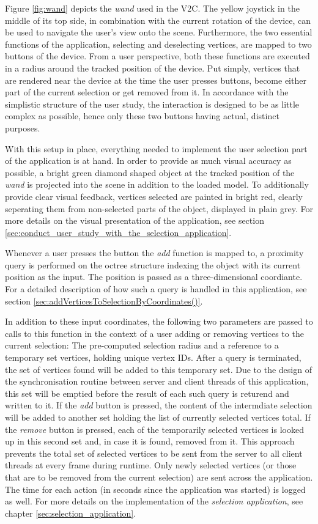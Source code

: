 Figure \ref{fig:wand} depicts the \textit{wand} used in the V2C. The yellow joystick in the middle of its top side, in combination with the current rotation of the device, can be used to navigate the user's view onto the scene. Furthermore, the two essential functions of the application, selecting and deselecting vertices, are mapped to two buttons of the device. From a user perspective, both these functions are executed in a radius around the tracked position of the device. Put simply, vertices that are rendered near the device at the time the user presses buttons, become either part of the current selection or get removed from it. In accordance with the simplistic structure of the user study, the interaction is designed to be as little complex as possible, hence only these two buttons having actual, distinct purposes. 

With this setup in place, everything needed to implement the user selection part of the application is at hand. In order to provide as much visual accuracy as possible, a bright green diamond shaped object at the tracked position of the \textit{wand} is projected into the scene in addition to the loaded model. To additionally provide clear visual feedback, vertices selected are painted in bright red, clearly seperating them from non-selected parts of the object, displayed in plain grey. For more details on the visual presentation of the application, see section \ref{sec:conduct_user_study_with_the_selection_application}.

Whenever a user presses the button the \textit{add} function is mapped to, a proximity query is performed on the octree structure indexing the object with its current position as the input. The position is passed as a three-dimensional coordiante. For a detailed description of how such a query is handled in this application, see section \ref{sec:addVerticesToSelectionByCoordinates()}.

In addition to these input coordinates, the following two parameters are passed to calls to this function in the context of a user adding or removing vertices to the current selection: The pre-computed selection radius and a reference to a temporary set vertices, holding unique vertex IDs. After a query is terminated, the set of vertices found will be added to this temporary set. Due to the design of the synchronisation routine between server and client threads of this application, this set will be emptied before the result of each such query is returend and written to it. If the \textit{add} button is pressed, the content of the intermdiate selection will be added to another set holding the list of currently selected vertices total. If the \textit{remove} button is pressed, each of the temporarily selected vertices is looked up in this second set and, in case it is found, removed from it. This approach prevents the total set of selected vertices to be sent from the server to all client threads at every frame during runtime. Only newly selected vertices (or those that are to be removed from the current selection) are sent across the application. The time for each action (in seconds since the application was started) is logged as well. For more details on the implementation of the \textit{selection application}, see chapter \ref{sec:selection_application}.

